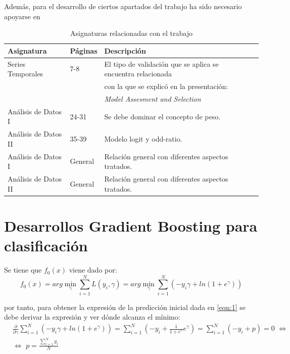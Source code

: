\documentclass[12pt,twoside]{article}
\begin{document}
Además, para el desarrollo de ciertos apartados del trabajo ha sido necesario apoyarse en
\begin{table}[ht] 
\centering
\begin{tabular}{llll} 
  \hline
 Asignatura & Páginas & Descripción  \\ 
  \hline
Series Temporales & 7-8 & El tipo de validación que se aplica se encuentra relacionada  \\ 
 &  &  con la que se explicó en la presentación: \\ 
 &  & \textit{Model Assesment and Selection} \\ 
Análisis de Datos I & 24-31 & Se debe dominar el concepto de peso. \\
Análisis de Datos II & 35-39 & Modelo logit y odd-ratio.\\ 
Análisis de Datos I & General & Relación general con diferentes aspectos tratados. \\
Análisis de Datos II & General & Relación general con diferentes aspectos tratados. \\
\hline
\end{tabular}
\caption{Asignaturas relacionadas con el trabajo} \label{tab{03}}
\end{table}




\newpage
\appendix
\section{Desarrollos Gradient Boosting para clasificación} \label{Anexo2}

Se tiene que $f_0(x)$ viene dado por:
\begin{equation*}
f_0(x) = arg\min_{\gamma} \sum_{i=1}^N L(y_i, \gamma) = arg\min_{\gamma} \sum_{i=1}^N \left( -y_i \gamma + ln \left( 1 + e^{\gamma} \right) \right)
\end{equation*}

\noindent
por tanto, para obtener la expresión de la predicción inicial dada en \ref{eqn:1} se debe derivar la expresión y ver dónde alcanza el mínimo:
\begin{equation*}
\begin{split}
& \frac{\partial}{\partial \gamma}\sum_{i=1}^N \left( -y_i \gamma + ln \left( 1 + e^{\gamma} \right) \right) = \sum_{i=1}^N \left( -y_i + \frac{1}{1 + e^{\gamma}} e^{\gamma} \right) = \sum_{i=1}^N (-y_i + p) = 0 \, \, \Leftrightarrow  \\
& \Leftrightarrow \, \, p = \frac{\sum_{i=1}^{N} y_i}{N} 
\end{split}
\end{equation*}
\end{document}
